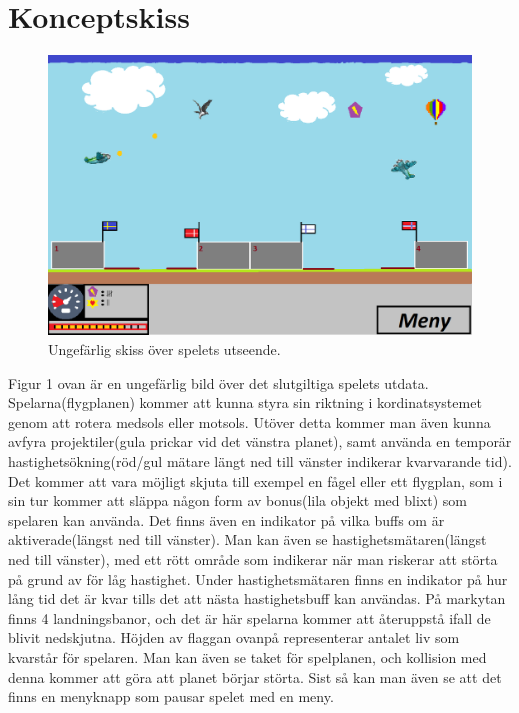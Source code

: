 \documentclass[12pt,a4paper]{article}
\begin{document}
\section{Konceptskiss}
\begin{figure}[H]
	\caption{Ungefärlig skiss över spelets utseende.}
	\centering
	\includegraphics[width=\linewidth]{Konceptskiss.png}
\end{figure}
Figur 1 ovan är en ungefärlig bild över det slutgiltiga spelets utdata. Spelarna(flygplanen) kommer att kunna styra sin riktning i kordinatsystemet genom att rotera medsols eller motsols. Utöver detta kommer man även kunna avfyra projektiler(gula prickar vid det vänstra planet), samt använda en temporär hastighetsökning(röd/gul mätare längt ned till vänster indikerar kvarvarande tid). Det kommer att vara möjligt skjuta till exempel en fågel eller ett flygplan, som i sin tur kommer att släppa någon form av bonus(lila objekt med blixt) som spelaren kan använda. Det finns även en indikator på vilka buffs om är aktiverade(längst ned till vänster). Man kan även se hastighetsmätaren(längst ned till vänster), med ett rött område som indikerar när man riskerar att störta på grund av för låg hastighet. Under hastighetsmätaren finns en indikator på hur lång tid det är kvar tills det att nästa hastighetsbuff kan användas.
På markytan finns 4 landningsbanor, och det är här spelarna kommer att återuppstå ifall de blivit nedskjutna. Höjden av flaggan ovanpå representerar antalet liv som kvarstår för spelaren. Man kan även se taket för spelplanen, och kollision med denna kommer att göra att planet börjar störta. Sist så kan man även se att det finns en menyknapp som pausar spelet med en meny. 
\vspace{0.4cm}
\end{document}
